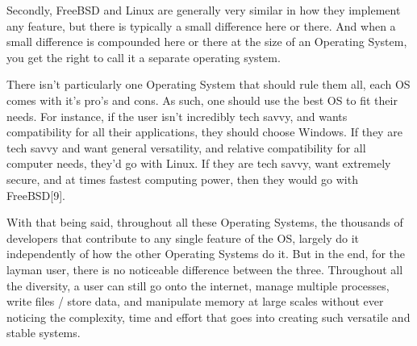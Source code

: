 \documentclass{article}
\begin{document}
    Secondly, FreeBSD and Linux are generally very similar in how they implement any feature, but there is typically a small difference here or there. And when a small difference is compounded here or there at the size of an Operating System, you get the right to call it a separate operating system. \newline

	There isn’t particularly one Operating System that should rule them all, each OS comes with it’s pro’s and cons. As such, one should use the best OS to fit their needs. For instance, if the user isn’t incredibly tech savvy, and wants compatibility for all their applications, they should choose Windows. If they are tech savvy and want general versatility, and relative compatibility for all computer needs, they’d go with Linux. If they are tech savvy, want extremely secure, and at times fastest computing power, then they would go with FreeBSD[9]. \newline

    With that being said, throughout all these Operating Systems, the thousands of developers that contribute to any single feature of the OS, largely do it independently of how the other Operating Systems do it. But in the end, for the layman user, there is no noticeable difference between the three. Throughout all the diversity, a user can still go onto the internet, manage multiple processes, write files / store data, and manipulate memory at large scales without ever noticing the complexity, time and effort that goes into creating such versatile and stable systems.\newpage
\end{document}
